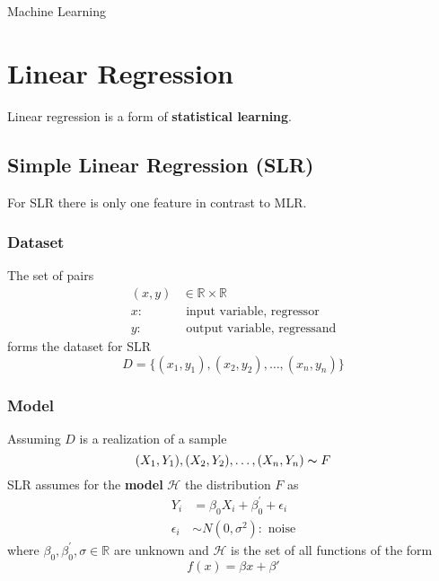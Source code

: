 \begin{center}
    \null{}
    \huge{Machine Learning\vspace*{0.4cm}\par}
\end{center}

\section{Linear Regression}
Linear regression is a form of \textbf{statistical learning}.
\subsection{Simple Linear Regression (SLR)}
For SLR there is only one feature in contrast to MLR.

\subsubsection{Dataset}
The set of pairs
\begin{align*}
    (x,y) & \in\mathbb{R}\times\mathbb{R}       \\
    x:    & \text{ input variable, regressor}   \\
    y:    & \text{ output variable, regressand}
\end{align*}
forms the dataset for SLR
\begin{equation*}
    D=\{(x_1,y_1),(x_2,y_2),\dots,(x_n,y_n)\}
\end{equation*}

\subsubsection{Model}
Assuming $D$ is a realization of a sample
\begin{equation*}
    (X_1,Y_1),(X_2,Y_2),\dots,(X_n,Y_n)\thicksim F
\end{equation*}
SLR assumes for the \textbf{model} $\mathcal{H}$ the distribution $F$ as
\begin{align*}
    Y_i        & =\beta_0X_i+\beta^{\prime}_0+\epsilon_i \\
    \epsilon_i & \sim N(0,\sigma^2): \text{ noise}
\end{align*}
where $\beta_0,\beta^{\prime}_0,\sigma\in\mathbb{R}$ are unknown and $\mathcal{H}$ is the set of all functions of the form
\begin{equation*}
    f(x)=\beta x+\beta'
\end{equation*}

